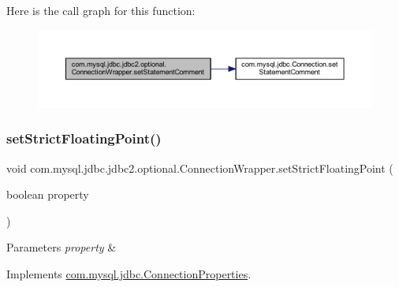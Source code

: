 Here is the call graph for this function\+:
\nopagebreak
\begin{figure}[H]
\begin{center}
\leavevmode
\includegraphics[width=350pt]{classcom_1_1mysql_1_1jdbc_1_1jdbc2_1_1optional_1_1_connection_wrapper_a31c5d98ba9578549f71ddae31c27fc7b_cgraph}
\end{center}
\end{figure}
\mbox{\label{classcom_1_1mysql_1_1jdbc_1_1jdbc2_1_1optional_1_1_connection_wrapper_a1549974fcca3a76425ac6155e2ae77c8}} 
\subsubsection{\texorpdfstring{set\+Strict\+Floating\+Point()}{setStrictFloatingPoint()}}
{\footnotesize\ttfamily void com.\+mysql.\+jdbc.\+jdbc2.\+optional.\+Connection\+Wrapper.\+set\+Strict\+Floating\+Point (\begin{DoxyParamCaption}\item[{boolean}]{property }\end{DoxyParamCaption})}


\begin{DoxyParams}{Parameters}
{\em property} & \\
\hline
\end{DoxyParams}


Implements \mbox{\hyperlink{interfacecom_1_1mysql_1_1jdbc_1_1_connection_properties_afbb6b6808923b1d248ce45db64bafb28}{com.\+mysql.\+jdbc.\+Connection\+Properties}}.

